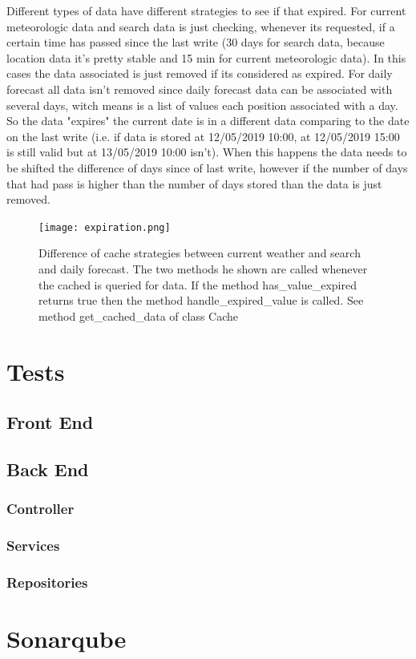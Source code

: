 \documentclass[12pt]{article}
\begin{document}
Different types of data have different strategies to see if that expired. For current meteorologic data
  and search data is just checking, whenever its requested, if a certain time has passed since the
  last write (30 days for search data, because location data it's pretty stable and 15 min for
  current meteorologic data). In this cases the data associated is just removed if its considered as
  expired. For daily forecast all data isn't removed since daily forecast data can be associated
  with several days, witch means is a list of values each position associated with a day. So the data
  "expires" the current date is in a different data comparing to the date on the last write (i.e. if
  data is stored at 12/05/2019 10:00, at 12/05/2019 15:00 is still valid but at 13/05/2019 10:00 isn't).
  When this happens the data needs to be shifted the difference of days since of last write, however if
  the number of days that had pass is higher than the number of days stored than the data is just removed.

\begin{figure}[h]
  \center
  \texttt{[image: expiration.png]}
  \caption{Difference of cache strategies between current weather and search and daily forecast.
    The two methods he shown are called whenever the cached is queried for data. If the
    method has\_value\_expired returns true then the method handle\_expired\_value is called. See
    method get\_cached\_data of class Cache}
\end{figure}

\section{Tests}

\subsection{Front End}
\subsection{Back End}
\subsubsection{Controller}
\subsubsection{Services}
\subsubsection{Repositories}
\section{Sonarqube}
\end{document}
